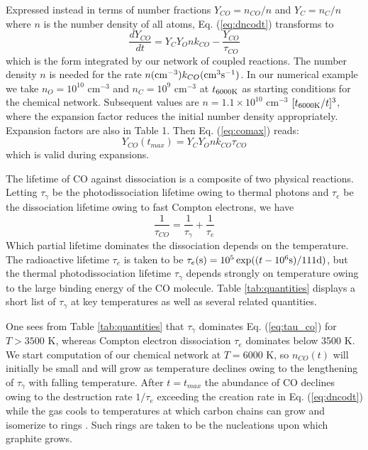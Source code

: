 \documentclass[manuscript]{aastex}
\begin{document}
\begin{CJK*}{UTF8}{gbsn}
Expressed instead in terms of number fractions $Y_{CO} = n_{CO} / n$
and $Y_C = n_C / n$ where $n$ is the number density of all atoms,
Eq. (\ref{eq:dncodt}) transforms to 
\begin{equation}
\frac{dY_{CO}}{dt} = Y_C Y_O n k_{CO} - \frac{Y_{CO}}{\tau_{CO}}	
\label{eq:dycodt}
\end{equation}
which is the form integrated by our network of coupled reactions.
The number density $n$ is needed for the rate
$n({\rm cm}^{-3}) k_{CO}({\rm cm}^3{\rm s}^{-1})$.
In our numerical example we take $n_O = 10^{10}$ cm$^{-3}$ and
$n_C = 10^9$ cm$^{-3}$ at $t_{6000 {\rm K}}$ as starting conditions for the
chemical network. Subsequent values are $n = 1.1 \times 10^{10}$ cm$^{-3}$
$[t_{6000 {\rm K}}/t]^3$, where the expansion factor reduces the initial number
density appropriately. Expansion factors are also in Table 1. Then
Eq. (\ref{eq:comax}) reads:
\begin{equation}
Y_{CO}(t_{max}) = Y_C Y_O n k_{CO} \tau_{CO}
\label{eq:ycomax}
\end{equation}
which is valid during expansions.

The lifetime of CO against dissociation is a composite of two physical
reactions. Letting $\tau_\gamma$ be the photodissociation lifetime owing
to thermal photons and $\tau_e$ be the dissociation lifetime owing to fast
Compton electrons, we have
\begin{equation}
\frac{1}{\tau_{CO}} = \frac{1}{\tau_\gamma} + \frac{1}{\tau_e}
\label{eq:tau_co}
\end{equation}
Which partial lifetime dominates the dissociation depends on the temperature.
The radioactive lifetime $\tau_e$ is taken to be
$\tau_e ({\rm s}) = 10^5 \exp( ( t -10^6{\rm s}) / 111 {\rm d} )$,
but the thermal photodissociation lifetime $\tau_\gamma$
depends strongly on temperature
owing to the large binding energy of the CO molecule.
Table \ref{tab:quantities} displays a
short list of $\tau_\gamma$ at key temperatures as well as several related
quantities.

One sees from Table \ref{tab:quantities}
that $\tau_\gamma$ dominates Eq. (\ref{eq:tau_co}) for $T > 3500$ K,
whereas Compton
electron dissociation $\tau_e$
dominates below 3500 K. We start computation of our
chemical network at $T = 6000$ K,
so $n_{CO}(t)$ will initially be small and will
grow as temperature declines owing to the lengthening of $\tau_\gamma$ with
falling temperature. After $t=t_{max}$ the abundance of CO declines owing to
the destruction rate $1/\tau_e$ exceeding the creation rate in
Eq. (\ref{eq:dncodt})
while the gas cools to temperatures at which carbon chains can grow and
isomerize to rings \citep{1999Sci...283.1290C}. Such rings are taken to be
the nucleations upon which graphite grows.


\end{CJK*}
\end{document}
